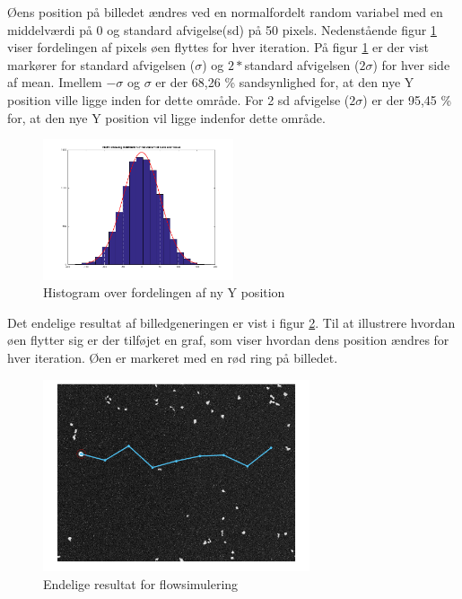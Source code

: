 Øens position på billedet ændres ved en normalfordelt random variabel med en middelværdi på 0 og standard afvigelse(sd) på 50 pixels. Nedenstående figur \ref{fig:histfit} viser fordelingen af pixels øen flyttes for hver iteration. På figur \ref{fig:histfit} er der vist markører for standard afvigelsen ($\sigma$) og $2*$standard afvigelsen ($2\sigma$) for hver side af mean. Imellem $-\sigma$ og $\sigma$ er der 68,26 \% sandsynlighed for, at den nye Y position ville ligge inden for dette område. For 2 sd afvigelse ($2\sigma$) er der 95,45 \% for, at den nye Y position vil ligge indenfor dette område.

\begin{figure}[H]
	\centering
	\includegraphics[width=0.5\textwidth]{billeder/software/histfit.png}
	\caption{Histogram over fordelingen af ny Y position}
	\label{fig:histfit}
\end{figure}

Det endelige resultat af billedgeneringen er vist i figur \ref{fig:finalresult}. Til at illustrere hvordan øen flytter sig er der tilføjet en graf, som viser hvordan dens position ændres for hver iteration. Øen er markeret med en rød ring på billedet.

\begin{figure}[H]
	\centering
	\includegraphics[width=0.7\textwidth]{billeder/software/final.png}
	\caption{Endelige resultat for flowsimulering}
	\label{fig:finalresult}
\end{figure}

